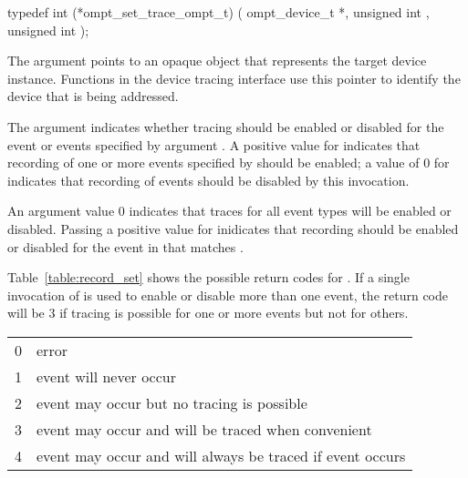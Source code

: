 \format
\begin{ccppspecific}
\begin{omptInquiry}
typedef int (*ompt_set_trace_ompt_t) (
  ompt_device_t *,
  unsigned int ,
  unsigned int 
);
\end{omptInquiry}
\end{ccppspecific}

\argdesc

The  argument points to an opaque object that represents
the target device instance. Functions in the device tracing interface
use this pointer to identify the device that is being addressed.

The argument  indicates whether tracing should be
enabled or disabled for the event or events specified by
argument . A positive value for 
indicates that recording of one or more events specified by
 should be enabled; a value of 0 for  indicates
that recording of events should be disabled by this invocation.

An argument  value 0 indicates that traces for all
event types will be enabled or disabled.  Passing a positive value for
 inidicates that recording should be enabled or disabled
for the event in  that matches .


\effect

Table~\ref{table:record_set} shows the possible return
codes for .  If a single invocation
of  is used to enable or disable
more than one event, the return code will
be 3 if tracing is possible for one or more events but not for
others.

\nolinenumbers
\renewcommand{\arraystretch}{1.5}
\tablelasttail{\hline}
\begin{supertabular}{p{2.0in} p{3.0in}}
0 & error\\
1 & event will never occur\\
2 & event may occur but no tracing is possible\\
3 & event may occur and will be traced when convenient\\
4 & event may occur and will always be traced if event occurs\\
\end{supertabular}

